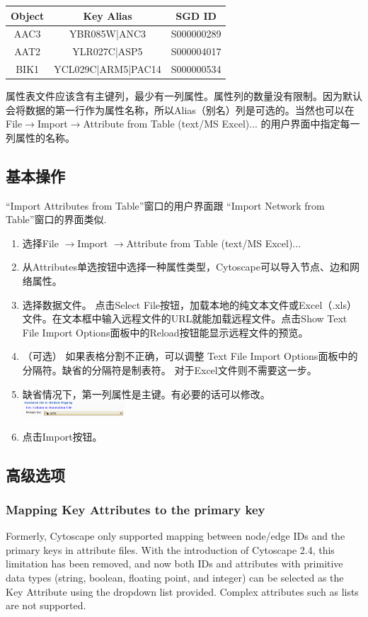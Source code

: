 \begin{tabular}{|c|c|c|}
\hline 
 Object& Key Alias& SGD ID\\
\hline
 AAC3 &YBR085W|ANC3& S000000289\\
 AAT2 &YLR027C|ASP5& S000004017\\
 BIK1 &YCL029C|ARM5|PAC14 &S000000534\\
 \hline 
\end{tabular}

属性表文件应该含有主键列，最少有一列属性。属性列的数量没有限制。因为默认会将数据的第一行作为属性名称，所以Alias（别名）列是可选的。当然也可以在
File$\rightarrow$Import$\rightarrow$Attribute from Table (text/MS Excel)...
的用户界面中指定每一列属性的名称。

\subsection{基本操作}
``Import Attributes from Table''窗口的用户界面跟
``Import Network from Table''窗口的界面类似. 
\begin{enumerate}
\item 选择File $\rightarrow$Import $\rightarrow$Attribute from Table (text/MS
Excel)... 
\item 从Attributes单选按钮中选择一种属性类型，Cytoscape可以导入节点、边和网络属性。
\item 选择数据文件。 点击Select File按钮，加载本地的纯文本文件或Excel（.xls）文件。在文本框中输入远程文件的URL就能加载远程文件。点击Show Text File Import Options面板中的Reload按钮能显示远程文件的预览。
\item （可选） 如果表格分割不正确，可以调整
Text File Import Options面板中的分隔符。缺省的分隔符是制表符。
对于Excel文件则不需要这一步。
\item 缺省情况下，第一列属性是主键。有必要的话可以修改。\\
\includegraphics[width=0.3\textwidth]{images/attribute_table_import_primary_key.png} 
\item 点击Import按钮。 
\end{enumerate}
 
\subsection{高级选项}
\subsubsection{Mapping Key Attributes to the primary key}
Formerly, Cytoscape only supported mapping between node/edge IDs and the
primary keys in attribute files. With the introduction of Cytoscape 2.4, this
limitation has been removed, and now both IDs and attributes with primitive
data types (string, boolean, floating point, and integer) can be selected as
the Key Attribute using the dropdown list provided. Complex attributes such as
lists are not supported. 

